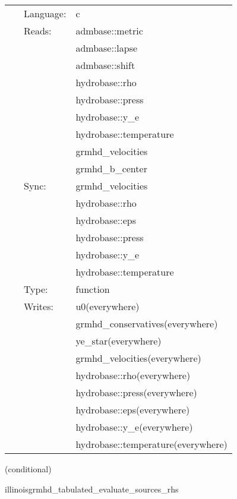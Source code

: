  \begin{tabular*}{160mm}{cll} 
~ & Language:  & c \\ 
~ & Reads:  & admbase::metric \\ 
~& ~ &admbase::lapse\\ 
~& ~ &admbase::shift\\ 
~& ~ &hydrobase::rho\\ 
~& ~ &hydrobase::press\\ 
~& ~ &hydrobase::y\_e\\ 
~& ~ &hydrobase::temperature\\ 
~& ~ &grmhd\_velocities\\ 
~& ~ &grmhd\_b\_center\\ 
~ & Sync:  & grmhd\_velocities \\ 
~& ~ &hydrobase::rho\\ 
~& ~ &hydrobase::eps\\ 
~& ~ &hydrobase::press\\ 
~& ~ &hydrobase::y\_e\\ 
~& ~ &hydrobase::temperature\\ 
~ & Type:  & function \\ 
~ & Writes:  & u0(everywhere) \\ 
~& ~ &grmhd\_conservatives(everywhere)\\ 
~& ~ &ye\_star(everywhere)\\ 
~& ~ &grmhd\_velocities(everywhere)\\ 
~& ~ &hydrobase::rho(everywhere)\\ 
~& ~ &hydrobase::press(everywhere)\\ 
~& ~ &hydrobase::eps(everywhere)\\ 
~& ~ &hydrobase::y\_e(everywhere)\\ 
~& ~ &hydrobase::temperature(everywhere)\\ 
\end{tabular*} 


\vspace{5mm}

   (conditional) 

\hspace{5mm} illinoisgrmhd\_tabulated\_evaluate\_sources\_rhs 

\hspace{5mm}{\it tabulated version of illinoisgrmhd\_evaluate\_sources\_rhs } 


\hspace{5mm}

